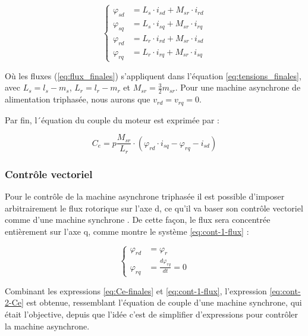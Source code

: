 \begin{equation}
    \left\{
    \begin{aligned}
    \varphi_{sd} &= L_s \cdot i_{sd} + M_{sr} \cdot i_{rd} \\
    \varphi_{sq} &= L_s \cdot i_{sq} + M_{sr} \cdot i_{rq} \\
    \varphi_{rd} &= L_r \cdot i_{rd} + M_{sr} \cdot i_{sd} \\
    \varphi_{rq} &= L_r \cdot i_{rq} + M_{sr} \cdot i_{sq}
    \end{aligned}
    \right.
    \label{eq:flux_finales}
\end{equation}

Où les fluxes (\ref{eq:flux_finales}) s'appliquent dans l'équation \ref{eq:tensions_finales}, avec $L_s = l_s - m_s$, $L_r = l_r - m_r$ et $M_{sr} = \frac{3}{2} m_{sr}$. Pour une machine asynchrone de alimentation triphasée, nous aurons que $v_{rd} = v_{rq} = 0$.

Par fin, l´équation du couple du moteur est exprimée par :

\begin{equation}
    C_e = p\frac{M_{sr}}{L_r} \cdot (\varphi_{rd} \cdot i_{sq} - \varphi_{rq} - i_{sd})
    \label{eq:Ce-finales}
\end{equation}


\FloatBarrier
\subsubsection{Contrôle vectoriel}


Pour le contrôle de la machine asynchrone triphasée il est possible d'imposer arbitrairement le flux rotorique sur l'axe d, ce qu'il va baser son contrôle vectoriel comme d'une machine synchrone \cite{TPBoileau}. De cette façon, le flux sera concentrée entièrement sur l'axe q, comme montre le système \ref{eq:cont-1-flux} :

\begin{equation}
    \left\{
    \begin{aligned}
    \varphi_{rd} &= \varphi_r \\
    \varphi_{rq} &= \frac{d \varphi_{rq}}{dt} = 0
    \end{aligned}
    \right.
    \label{eq:cont-1-flux}
\end{equation}

Combinant les expressions \ref{eq:Ce-finales} et \ref{eq:cont-1-flux}, l'expression \ref{eq:cont-2-Ce} est obtenue, ressemblant l'équation de couple d'une machine synchrone, qui était l'objective, depuis que l'idée c'est de simplifier d'expressions pour contrôler la machine asynchrone.

